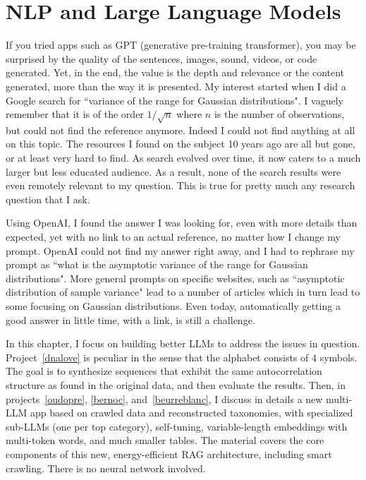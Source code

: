 \documentclass[oneside,10pt]{book}
\begin{document}

\chapter{NLP and Large Language Models}\label{nlpllm}

If you tried apps such as \textcolor{index}{GPT} (generative pre-training transformer), you may be surprised by the quality of the sentences, images, sound, videos, or code generated. Yet, in the end, the value is the depth and relevance or the content generated, more than the way it is presented. My interest started when I did a Google search for ``variance of the range for Gaussian distributions". I vaguely remember that it is of the order $1/\sqrt{n}$ where $n$ is the number of observations, but could not find the reference anymore. Indeed I could not find anything at all on this topic. The resources I found on the subject 10 years ago are all but gone, or at least very hard to find. As search evolved over time, it now caters to a much larger but less educated audience. As a result, none of the search results were even remotely relevant to my question. This is true for pretty much any research question that I ask. 

Using OpenAI, I found the answer I was looking for, even with more details than expected, yet with no link to an actual reference, no matter how I change my prompt. OpenAI could not find my answer right away, and I had to rephrase my prompt as 
``what is the asymptotic variance of the range for Gaussian distributions". More general prompts on specific websites, such as ``asymptotic distribution of sample variance" lead to a number of articles which in turn lead to some focusing on Gaussian distributions. Even today, 
 automatically getting a good answer in little time, with a link, is still a challenge.

In this chapter, I focus on building better \textcolor{index}{LLMs} to address the issues in question. Project~\ref{dnalove} is peculiar in the sense
 that the alphabet consists of 4 symbols. The goal is to synthesize sequences that exhibit the same autocorrelation structure as found in the original data, and then evaluate the results. Then, in projects~\ref{oudopre}, \ref{bernoc}, and~\ref{beurreblanc}, 
I discuss in details a new multi-LLM app based on crawled data and reconstructed taxonomies, with specialized sub-LLMs (one per top category), self-tuning,
 variable-length embeddings with multi-token words, and much smaller tables. The material covers the core components of this new, energy-efficient 
\textcolor{index}{RAG} architecture,
 including smart crawling. There is no neural network involved. 
\end{document}
